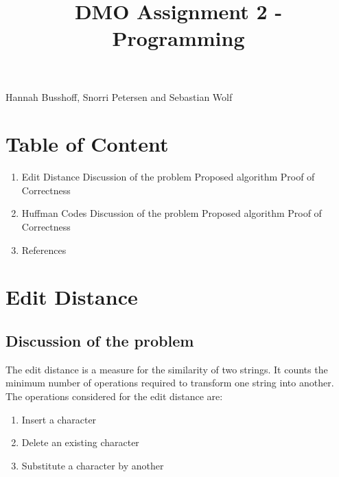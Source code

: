 \documentclass[11pt]{article}
\title{DMO Assignment 2 - Programming}
\providecommand{\tightlist}{%
      \setlength{\itemsep}{0pt}\setlength{\parskip}{0pt}}
\begin{document}
    
    
    \maketitle
    
    

    
    Hannah Busshoff, Snorri Petersen and Sebastian Wolf

\section*{Table of Content}\label{table-of-content}

\begin{enumerate}
\def\labelenumi{\arabic{enumi}.}
\tightlist
\item
  Edit Distance  Discussion of the problem  Proposed algorithm  Proof of Correctness
\item
  Huffman Codes  Discussion of the problem  Proposed algorithm  Proof of Correctness
\item
  References
\end{enumerate}

    \section{Edit Distance}\label{edit-distance}

\subsection{Discussion of the problem}\label{discussion-of-the-problem}

The edit distance is a measure for the similarity of two strings. It
counts the minimum number of operations required to transform one string
into another. The operations considered for the edit distance are:

\begin{enumerate}
\def\labelenumi{\arabic{enumi}.}
\tightlist
\item
  Insert a character
\item
  Delete an existing character
\item
  Substitute a character by another
\end{enumerate}
\end{document}
